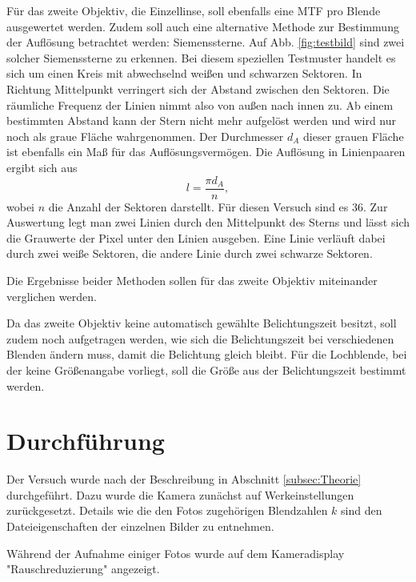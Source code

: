 		Für das zweite Objektiv, die Einzellinse, soll ebenfalls eine MTF pro Blende ausgewertet werden.
		Zudem soll auch eine alternative Methode zur Bestimmung der Auflösung betrachtet werden: Siemenssterne.
		Auf Abb. \ref{fig:testbild} sind zwei solcher Siemenssterne zu erkennen.
		Bei diesem speziellen Testmuster handelt es sich um einen Kreis mit abwechselnd weißen und schwarzen Sektoren.		
		In Richtung Mittelpunkt verringert sich der Abstand zwischen den Sektoren. 
		Die räumliche Frequenz der Linien nimmt also von außen nach innen zu. 
		Ab einem bestimmten Abstand kann der Stern nicht mehr aufgelöst werden und wird nur noch als graue Fläche wahrgenommen.
		Der Durchmesser $d_A$ dieser grauen Fläche ist ebenfalls ein Maß für das Auflösungsvermögen.
		Die Auflösung in Linienpaaren ergibt sich aus
		\begin{equation}
			l = \frac{\pi d_A}{n},
		\end{equation}
		wobei $n$ die Anzahl der Sektoren darstellt.
		Für diesen Versuch sind es 36.
		Zur Auswertung legt man zwei Linien durch den Mittelpunkt des Sterns und lässt sich die Grauwerte der Pixel unter den Linien ausgeben. 
		Eine Linie verläuft dabei durch zwei weiße Sektoren, die andere Linie durch zwei schwarze Sektoren.
		
		Die Ergebnisse beider Methoden sollen für das zweite Objektiv miteinander verglichen werden.
		
		Da das zweite Objektiv keine automatisch gewählte Belichtungszeit besitzt, soll zudem noch aufgetragen werden, wie sich die Belichtungszeit bei verschiedenen Blenden ändern muss, damit die Belichtung gleich bleibt.
		Für die Lochblende, bei der keine Größenangabe vorliegt, soll die Größe aus der Belichtungszeit bestimmt werden.
		
\section{Durchführung}
	
	Der Versuch wurde nach der Beschreibung in Abschnitt \ref{subsec:Theorie} durchgeführt.
	Dazu wurde die Kamera zunächst auf Werkeinstellungen zurückgesetzt. 
	Details wie die den Fotos zugehörigen Blendzahlen $k$ sind den Dateieigenschaften der einzelnen Bilder zu entnehmen.
	
	Während der Aufnahme einiger Fotos wurde auf dem Kameradisplay "Rauschreduzierung" angezeigt.
	
